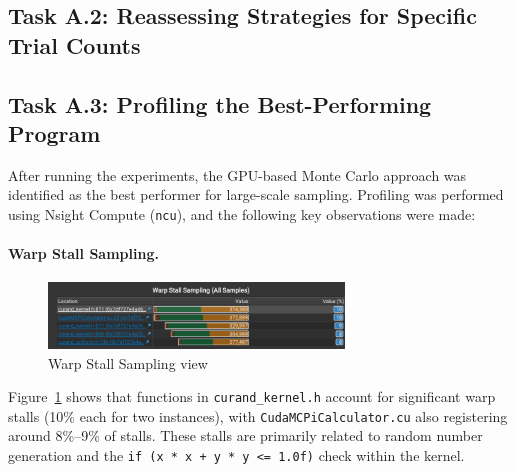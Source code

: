 \documentclass[12pt]{article}
\begin{document}




\subsection{Task A.2: Reassessing Strategies for Specific Trial Counts}




\subsection{Task A.3: Profiling the Best-Performing Program}
After running the experiments, the GPU-based Monte Carlo approach was
identified as the best performer for large-scale sampling. Profiling was
performed using Nsight Compute (\texttt{ncu}), and the following key
observations were made:

\paragraph{Warp Stall Sampling.}
\begin{figure}[ht]
      \centering
      \includegraphics[width=0.7\textwidth]{images/stalls.png}
      \caption{Warp Stall Sampling view}\label{fig:warp-stalls}
\end{figure}
Figure~\ref{fig:warp-stalls} shows that functions in \texttt{curand\_kernel.h}
account for significant warp stalls (10\% each for two instances), with
\texttt{CudaMCPiCalculator.cu} also registering around 8\%--9\% of stalls.
These stalls are primarily related to random number generation and the
\texttt{if (x * x + y * y <= 1.0f)} check within the kernel.
\end{document}
